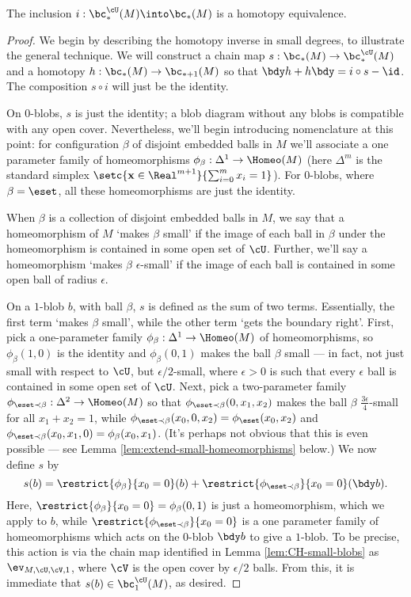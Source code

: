 \begin{thm}
The inclusion $i: \bc^{\cU}_*(M) \into \bc_*(M)$ is a homotopy equivalence.
\end{thm}
\begin{proof}
We begin by describing the homotopy inverse in small degrees, to illustrate the general technique.
We will construct a chain map $s:  \bc_*(M) \to \bc^{\cU}_*(M)$ and a homotopy $h:\bc_*(M) \to \bc_{*+1}(M)$ so that $\bdy h+h \bdy=i\circ s - \id$. The composition $s \circ i$ will just be the identity.

On $0$-blobs, $s$ is just the identity; a blob diagram without any blobs is compatible with any open cover. Nevertheless, we'll begin introducing nomenclature at this point: for configuration $\beta$ of disjoint embedded balls in $M$ we'll associate a one parameter family of homeomorphisms $\phi_\beta : \Delta^1 \to \Homeo(M)$ (here $\Delta^m$ is the standard simplex $\setc{\mathbf{x} \in \Real^{m+1}}{\sum_{i=0}^m x_i = 1}$). For $0$-blobs, where $\beta = \eset$, all these homeomorphisms are just the identity.

When $\beta$ is a collection of disjoint embedded balls in $M$, we say that a homeomorphism of $M$ `makes $\beta$ small' if the image of each ball in $\beta$ under the homeomorphism is contained in some open set of $\cU$. Further, we'll say a homeomorphism `makes $\beta$ $\epsilon$-small' if the image of each ball is contained in some open ball of radius $\epsilon$.

On a $1$-blob $b$, with ball $\beta$, $s$ is defined as the sum of two terms. Essentially, the first term `makes $\beta$ small', while the other term `gets the boundary right'. First, pick a one-parameter family $\phi_\beta : \Delta^1 \to \Homeo(M)$ of homeomorphisms, so $\phi_\beta(1,0)$ is the identity and $\phi_\beta(0,1)$ makes the ball $\beta$ small --- in fact, not just small with respect to $\cU$, but $\epsilon/2$-small, where $\epsilon > 0$ is such that every $\epsilon$ ball is contained in some open set of $\cU$. Next, pick a two-parameter family $\phi_{\eset \prec \beta} : \Delta^2 \to \Homeo(M)$ so that $\phi_{\eset \prec \beta}(0,x_1,x_2)$ makes the ball $\beta$ $\frac{3\epsilon}{4}$-small for all $x_1+x_2=1$, while $\phi_{\eset \prec \beta}(x_0,0,x_2) = \phi_\eset(x_0,x_2)$ and $\phi_{\eset \prec \beta}(x_0,x_1,0) = \phi_\beta(x_0,x_1)$. (It's perhaps not obvious that this is even possible --- see Lemma \ref{lem:extend-small-homeomorphisms} below.) We now define $s$ by
$$s(b) = \restrict{\phi_\beta}{x_0=0}(b) + \restrict{\phi_{\eset \prec \beta}}{x_0=0}(\bdy b).$$
Here, $\restrict{\phi_\beta}{x_0=0} = \phi_\beta(0,1)$ is just a homeomorphism, which we apply to $b$, while $\restrict{\phi_{\eset \prec \beta}}{x_0=0}$ is a one parameter family of homeomorphisms which acts on the $0$-blob $\bdy b$ to give a $1$-blob. To be precise, this action is via the chain map identified in Lemma \ref{lem:CH-small-blobs} as $\ev_{M, \cU, \cV, 1}$, where $\cV$ is the open cover by $\epsilon/2$ balls. From this, it is immediate that $s(b) \in \bc^{\cU}_1(M)$, as desired.


\end{proof}
